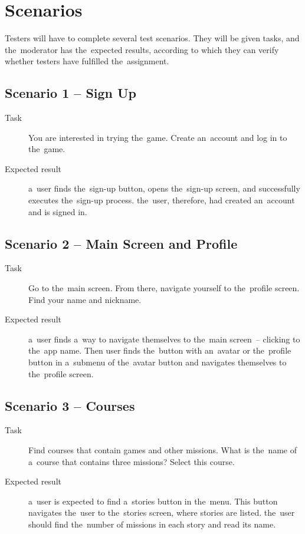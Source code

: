 \section{Scenarios}

Testers will have to complete several test scenarios.
They will be given tasks, and the~moderator has the~expected results, according to which they can verify whether testers have fulfilled the~assignment.

\subsection*{Scenario 1 -- Sign Up}

\begin{description}
    \item[Task] You are interested in trying the~game.
    Create an~account and log in to the~game.
    \item[Expected result] a~user finds the~sign-up button, opens the~sign-up screen, and successfully executes the~sign-up process.
    the~user, therefore, had created an~account and is signed in.
\end{description}

\subsection*{Scenario 2 -- Main Screen and Profile}

\begin{description}
    \item[Task] Go to the~main screen.
    From there, navigate yourself to the~profile screen.
    Find your name and nickname.
    \item[Expected result] a~user finds a~way to navigate themselves to the~main screen~-- clicking to the~app name.
    Then user finds the~button with an~avatar or the~profile button in a~submenu of the~avatar button and navigates themselves to the~profile screen.
\end{description}

\subsection*{Scenario 3 -- Courses}

\begin{description}
    \item[Task] Find courses that contain games and other missions.
    What is the~name of a~course that contains three missions?
    Select this course.
    \item[Expected result] a~user is expected to find a~stories button in the~menu.
    This button navigates the~user to the~stories screen, where stories are listed.
    the~user should find the~number of missions in each story and read its name.
\end{description}

